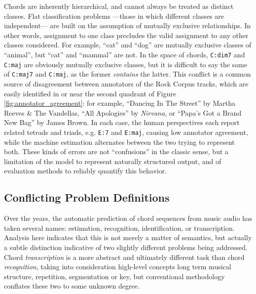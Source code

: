 \documentclass{article}
\begin{document}
Chords are inherently hierarchical, and cannot always be treated as distinct classes.
Flat classification problems ---those in which different classes are independent--- are built on the assumption of mutually exclusive relationships.
In other words, assignment to one class precludes the valid assignment to any other classes considered.
For example, ``cat'' and ``dog'' are mutually exclusive classes of ``animal'', but ``cat'' and ``mammal'' are not.
In the space of chords, \texttt{C:dim7} and \texttt{C:maj} are obviously mutually exclusive classes, but it is difficult to say the same of \texttt{C:maj7} and \texttt{C:maj}, as the former \emph{contains} the latter.
This conflict is a common source of disagreement between annotators of the Rock Corpus tracks, which are easily identified in or near the second quadrant of Figure \ref{fig:annotator_agreement}:
for example, ``Dancing In The Street'' by Martha Reeves \& The Vandellas, ``All Apologies'' by \emph{Nirvana}, or ``Papa's Got a Brand New Bag'' by James Brown.
In each case, the human perspectives each report related tetrads and triads, e.g. \texttt{E:7} and \texttt{E:maj}, causing low annotator agreement, while the machine estimation alternates between the two trying to represent both.
These kinds of errors are not ``confusions'' in the classic sense, but a limitation of the model to represent naturally structured output, and of evaluation methods to reliably quantify this behavior.




\subsection{Conflicting Problem Definitions}

Over the years, the automatic prediction of chord sequences from music audio has taken several names: estimation, recognition, identification, or transcription.
Analysis here indicates that this is not merely a matter of semantics, but actually a subtle distinction indicative of two slightly different problems being addressed.
Chord \emph{transcription} is a more abstract and ultimately different task than chord \emph{recognition}, taking into consideration high-level concepts long term musical structure, repetition, segmentation or key, but conventional methodology conflates these two to some unknown degree.
\end{document}

